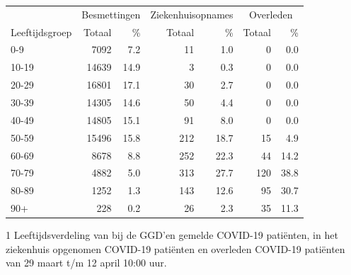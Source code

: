 \documentclass[
  english,
  man,floatsintext]{apa6}
\begin{document}
\begin{table}
\centering\begingroup\fontsize{11}{13}\selectfont

\begin{threeparttable}
\begin{tabular}{lrrrrrr}
\toprule
\multicolumn{1}{c}{ } & \multicolumn{2}{c}{Besmettingen} & \multicolumn{2}{c}{Ziekenhuisopnames} & \multicolumn{2}{c}{Overleden} \\
\cmidrule(l{3pt}r{3pt}){2-3} \cmidrule(l{3pt}r{3pt}){4-5} \cmidrule(l{3pt}r{3pt}){6-7}
Leeftijdsgroep & Totaal & \% & Totaal & \% & Totaal & \%\\
\midrule
0-9 & 7092 & 7.2 & 11 & 1.0 & 0 & 0.0\\
10-19 & 14639 & 14.9 & 3 & 0.3 & 0 & 0.0\\
20-29 & 16801 & 17.1 & 30 & 2.7 & 0 & 0.0\\
30-39 & 14305 & 14.6 & 50 & 4.4 & 0 & 0.0\\
40-49 & 14805 & 15.1 & 91 & 8.0 & 0 & 0.0\\
50-59 & 15496 & 15.8 & 212 & 18.7 & 15 & 4.9\\
60-69 & 8678 & 8.8 & 252 & 22.3 & 44 & 14.2\\
70-79 & 4882 & 5.0 & 313 & 27.7 & 120 & 38.8\\
80-89 & 1252 & 1.3 & 143 & 12.6 & 95 & 30.7\\
90+ & 228 & 0.2 & 26 & 2.3 & 35 & 11.3\\
\bottomrule
\end{tabular}
\begin{tablenotes}
\item[1] Leeftijdsverdeling van bij de GGD’en gemelde COVID-19 patiënten, in het ziekenhuis opgenomen COVID-19 patiënten en overleden COVID-19 patiënten van 29 maart t/m 12 april 10:00 uur.
\end{tablenotes}
\end{threeparttable}
\endgroup{}
\end{table}

\newpage
\end{document}
